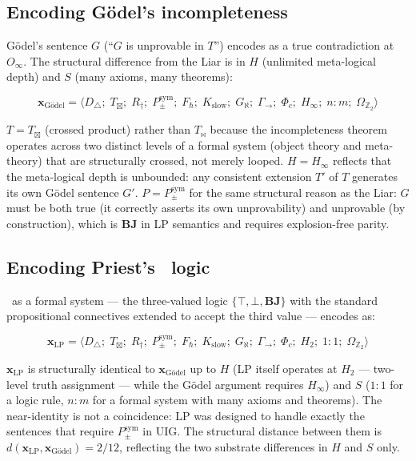 \documentclass[12pt,a4paper]{article}
\newcommand{\xvec}{\mathbf{x}}
\newcommand{\Phic}{\Phi_c}
\newcommand{\Ppms}{P_{\pm}^{\text{sym}}}
\newcommand{\Oinf}{O_\infty}
\newcommand{\Tbw}{T_{\mathord{\bowtie}}}
\newcommand{\glp}{\text{LP}}
\begin{document}
\subsection{Encoding G\"{o}del's incompleteness}
\label{sec:encoding_godel}

G\"{o}del's sentence $G$ (``$G$ is unprovable in $T$'') encodes as a
true contradiction at $\Oinf$. The structural difference from the Liar
is in $H$ (unlimited meta-logical depth) and $S$ (many axioms, many
theorems):

\begin{equation}
  \xvec_\text{G\"{o}del} = \langle D_\triangle;\; T_\boxtimes;\; R_\dagger;\;
  \Ppms;\; F_\hbar;\; K_\text{slow};\; G_\aleph;\; \Gamma_{\to};\;
  \Phic;\; H_\infty;\; n{:}m;\; \Omega_{\mathbb{Z}_2} \rangle
\end{equation}

$T = T_\boxtimes$ (crossed product) rather than $\Tbw$ because the
incompleteness theorem operates across two distinct levels of a formal
system (object theory and meta-theory) that are structurally crossed,
not merely looped. $H = H_\infty$ reflects that the meta-logical depth
is unbounded: any consistent extension $T'$ of $T$ generates its own
G\"{o}del sentence $G'$. $P = \Ppms$ for the same structural reason as
the Liar: $G$ must be both true (it correctly asserts its own
unprovability) and unprovable (by construction), which is
$\mathbf{BJ}$ in LP semantics and requires explosion-free parity.

\subsection{Encoding Priest's \glp\ logic}
\label{sec:encoding_lp}

\glp\ as a formal system --- the three-valued logic
$\{\top, \bot, \mathbf{BJ}\}$ with the standard propositional
connectives extended to accept the third value --- encodes as:

\begin{equation}
  \xvec_{\glp} = \langle D_\triangle;\; T_\boxtimes;\; R_\dagger;\;
  \Ppms;\; F_\hbar;\; K_\text{slow};\; G_\aleph;\; \Gamma_{\to};\;
  \Phic;\; H_2;\; 1{:}1;\; \Omega_{\mathbb{Z}_2} \rangle
\end{equation}

$\xvec_{\glp}$ is structurally identical to $\xvec_\text{G\"{o}del}$
up to $H$ (LP itself operates at $H_2$ --- two-level truth assignment
--- while the G\"{o}del argument requires $H_\infty$) and $S$
($1{:}1$ for a logic rule, $n{:}m$ for a formal system with many
axioms and theorems). The near-identity is not a coincidence: LP was
designed to handle exactly the sentences that require $\Ppms$ in UIG.
The structural distance between them is $d(\xvec_{\glp},
\xvec_\text{G\"{o}del}) = 2/12$, reflecting the two substrate
differences in $H$ and $S$ only.
\end{document}
